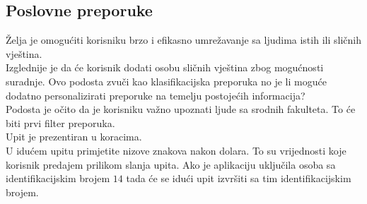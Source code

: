 \documentclass[titlepage, 12pt]{scrartcl}
\begin{document}
\subsection{Poslovne preporuke}
Želja je omogućiti korisniku brzo i efikasno umrežavanje sa ljudima istih ili sličnih vještina. \\
Izglednije je da će korisnik dodati osobu sličnih vještina zbog mogućnosti suradnje. Ovo podosta zvuči kao klasifikacijska preporuka no je li moguće dodatno personalizirati preporuke na temelju postojećih informacija? \\
Podosta je očito da je korisniku važno upoznati ljude sa srodnih fakulteta. To će biti prvi filter preporuka.\\
Upit je prezentiran u koracima. \\
U idućem upitu primjetite nizove znakova nakon dolara. To su vrijednosti koje korisnik predajem prilikom slanja upita. Ako je aplikaciju  uključila osoba sa identifikacijskim brojem $14$ tada će se idući upit izvršiti sa tim identifikacijskim brojem.
\end{document}
